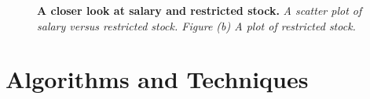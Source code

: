 \documentclass[twoside,openright,titlepage,numbers=noenddot,headinclude,%
               footinclude=true,cleardoublepage=empty,abstractoff,BCOR=5mm,%
               paper=a4,fontsize=11pt,ngerman,american]{scrreprt}
\numberwithin{theorem}{chapter}
\numberwithin{definition}{chapter}
\numberwithin{algorithm}{chapter}
\numberwithin{figure}{chapter}
\numberwithin{table}{chapter}
\numberwithin{equation}{chapter}
\begin{document}
\begin{figure}[!hbtp]
\centering
    
    \caption{\textbf{A closer look at salary and restricted stock.} \textit{A scatter plot of salary versus restricted stock. Figure (b) A plot of restricted stock.}}
\end{figure}

\clearpage
\section*{Algorithms and Techniques}
\end{document}
